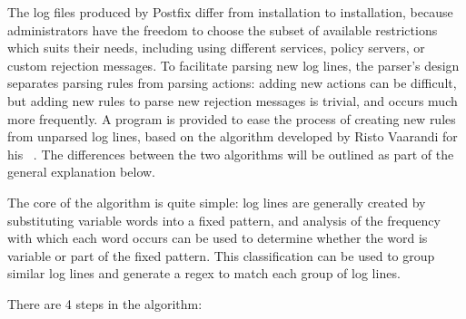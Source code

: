 The log files produced by Postfix differ from installation to installation,
because administrators have the freedom to choose the subset of available
restrictions which suits their needs, including using different \DNSBL{}
services, policy servers, or custom rejection messages.  To facilitate
parsing new log lines, the parser's design separates parsing rules from
parsing actions: adding new actions can be difficult, but adding new rules
to parse new rejection messages is trivial, and occurs much more
frequently.  A program is provided to ease the process of creating new
rules from unparsed log lines, based on the algorithm developed by Risto
Vaarandi for his \SLCT{}~\cite{slct-paper}.  The differences between the
two algorithms will be outlined as part of the general explanation below.

The core of the \SLCT{} algorithm is quite simple: log lines are generally
created by substituting variable words into a fixed pattern, and analysis
of the frequency with which each word occurs can be used to determine
whether the word is variable or part of the fixed pattern.  This
classification can be used to group similar log lines and generate a
regex to match each group of log lines.

There are 4 steps in the algorithm:

